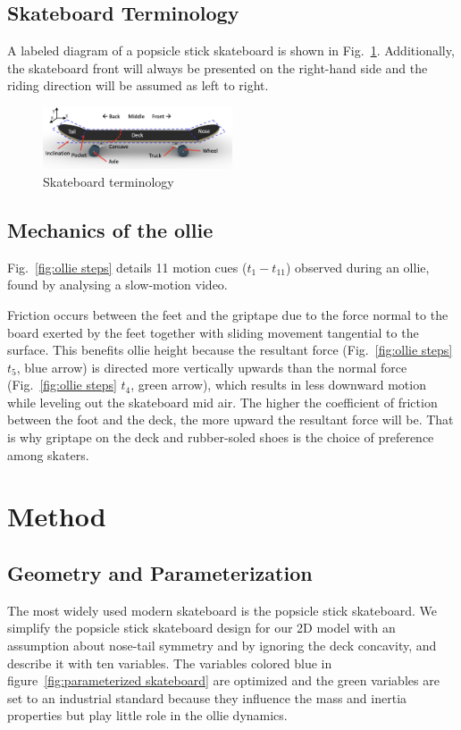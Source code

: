 \documentclass[default,iicol]{sn-jnl}
\begin{document}
\subsection{Skateboard Terminology}
A labeled diagram of a popsicle stick skateboard is shown in Fig.~\ref{fig:skateboard terminology}. 
Additionally, the skateboard front will always be presented on the right-hand side and the riding direction will be assumed as left to right.

\begin{figure}[t]
    \includegraphics[width=0.5\textwidth]{figure/terminology.png}
    \caption[Skateboard terminology]{Skateboard terminology}
    \label{fig:skateboard terminology}
\end{figure}

\subsection{Mechanics of the ollie} \label{ss_mechanics}
Fig.~\ref{fig:ollie steps} details 11 motion cues ($t_1-t_{11}$) observed during an ollie, found by analysing a slow-motion video.

Friction occurs between the feet and the griptape due to the force normal to the board exerted by the feet together with sliding movement tangential to the surface.
This benefits ollie height because the resultant force (Fig.~\ref{fig:ollie steps} $t_5$, blue arrow) is directed more vertically upwards than the normal force (Fig.~\ref{fig:ollie steps} $t_4$, green arrow), which results in less downward motion while leveling out the skateboard mid air.
The higher the coefficient of friction between the foot and the deck, the more upward the resultant force will be.
That is why griptape on the deck and rubber-soled shoes is the choice of preference among skaters.

\section{Method}

\subsection{Geometry and Parameterization}\label{s_paropt}
The most widely used modern skateboard is the popsicle stick skateboard. We simplify the popsicle stick skateboard design for our 2D model with an assumption about nose-tail symmetry and by ignoring the deck concavity, and describe it with ten variables. The variables colored blue in figure~\ref{fig:parameterized skateboard} are optimized and the green variables are set to an industrial standard because they influence the mass and inertia properties but play little role in the ollie dynamics.
\end{document}
